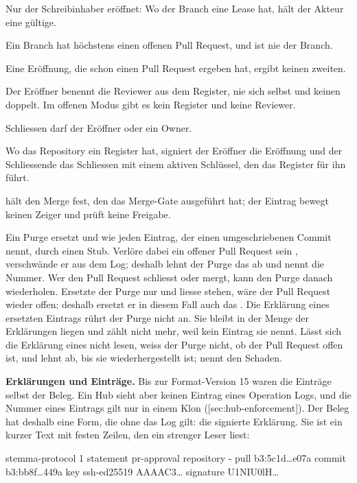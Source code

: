 \startitemize
\item Nur der Schreibinhaber eröffnet: Wo der Branch eine Lease hat, hält der Akteur eine
gültige.
\item Ein Branch hat höchstens einen offenen Pull Request, und  ist nie der Branch.
\item Eine Eröffnung, die schon einen Pull Request ergeben hat, ergibt keinen zweiten.
\item Der Eröffner benennt die Reviewer aus dem Register, nie sich selbst und keinen doppelt.
Im offenen Modus gibt es kein Register und keine Reviewer.
\item Schliessen darf der Eröffner oder ein Owner.
\item Wo das Repository ein Register hat, signiert der Eröffner die Eröffnung und der Schliessende
das Schliessen mit einem aktiven Schlüssel, den das Register für ihn führt.
\item {} hält den Merge fest, den das Merge-Gate ausgeführt hat; der Eintrag
bewegt keinen Zeiger und prüft keine Freigabe.
\stopitemize

Ein Purge ersetzt  und  wie jeden Eintrag, der einen umgeschriebenen
Commit nennt, durch einen Stub.
Verlöre dabei ein offener Pull Request sein , verschwände er aus dem Log;
deshalb lehnt der Purge das ab und nennt die Nummer.
Wer den Pull Request schliesst oder mergt, kann den Purge danach wiederholen.
Ersetzte der Purge nur  und liesse  stehen, wäre der Pull Request
wieder offen; deshalb ersetzt er in diesem Fall auch das .
Die Erklärung eines ersetzten Eintrags rührt der Purge nicht an.
Sie bleibt in der Menge der Erklärungen liegen und zählt nicht mehr, weil kein Eintrag sie nennt.
Lässt sich die Erklärung eines  nicht lesen, weiss der Purge nicht, ob der Pull
Request offen ist, und lehnt ab, bis sie wiederhergestellt ist;  nennt den
Schaden.

{\bf Erklärungen und Einträge.}
Bis zur Format-Version 15 waren die Einträge selbst der Beleg.
Ein Hub sieht aber keinen Eintrag eines Operation Logs, und die Nummer eines Eintrags gilt nur
in einem Klon ([sec:hub-enforcement]).
Der Beleg hat deshalb eine Form, die ohne das Log gilt: die signierte Erklärung.
Sie ist ein kurzer Text mit festen Zeilen, den ein strenger Leser liest:

\starttyping
stemma-protocol 1
statement pr-approval
repository -
pull b3:5c1d…e07a
commit b3:bb8f…449a
key ssh-ed25519 AAAAC3…
signature U1NIU0lH…
\stoptyping

